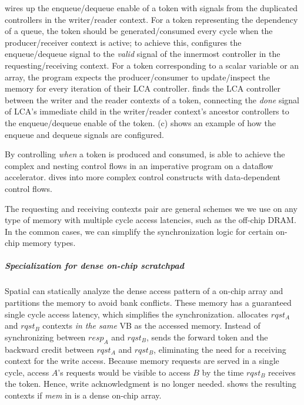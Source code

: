 \name wires up the enqueue/dequeue enable of a token with signals from the duplicated controllers 
in the writer/reader context.
For a token representing the dependency of a queue, the token should be generated/consumed every cycle 
when the producer/receiver context is active; to achieve this, \name configures the enqueue/dequeue signal
to the \emph{valid} signal of the innermost controller in the requesting/receiving context.
For a token corresponding to a scalar variable or an array, the program expects the producer/consumer
to update/inspect the memory for every iteration of their LCA controller.
\name finds the LCA controller between the writer and the reader contexts of a token,
connecting the \emph{done} signal of LCA's immediate child in the writer/reader context's 
ancestor controllers to the enqueue/dequeue enable of the token.
 (c) shows an example of how the enqueue and dequeue signals are configured.

By controlling \emph{when} a token is produced and consumed, \name is able to achieve the complex
and nesting control flows in an imperative program on a dataflow accelerator.
 dives into more complex control constructs with 
data-dependent control flows.

The requesting and receiving contexts pair are general schemes we we use on any type of memory with 
multiple cycle access latencies, such as the off-chip DRAM.
In the common cases, we can simplify the synchronization logic for certain on-chip memory types.

\subparagraph{Specialization for dense on-chip scratchpad}
Spatial can statically analyze the dense access pattern of a on-chip array and partitions the memory
to avoid bank conflicts. These memory has a guaranteed single cycle access latency, 
which simplifies the synchronization.
\name allocates $rqst_A$ and $rqst_B$ contexts \emph{in the same} VB as the accessed memory.
Instead of synchronizing between $resp_A$ and $rqst_B$, \name sends the forward token and the
backward credit between $rqst_A$ and $rqst_B$,
eliminating the need for a receiving context for the write access.
Because memory requests are served in a single cycle, access $A$'s requests would be visible to
access $B$ by the time $rqst_B$ receives the token. Hence, write acknowledgment is no longer needed.
 shows the resulting contexts if \emph{mem} in  is a dense
on-chip array.

